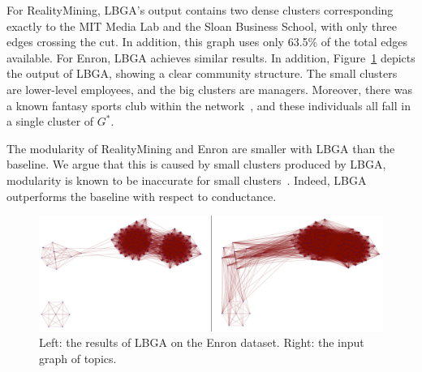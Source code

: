 \documentclass{article}
\begin{document}
For RealityMining, LBGA's output contains two dense clusters corresponding
exactly to the MIT Media Lab and the Sloan Business School, with only three
edges crossing the cut. In addition, this graph uses only 63.5\% of the total
edges available. For Enron, LBGA achieves similar results. In addition,
Figure~\ref{fig:enron-comparison} depicts the output of LBGA, showing a clear
community structure.  The small clusters are lower-level employees, and the big
clusters are managers. Moreover, there was a known fantasy sports club within
the network~\cite{Mccallum05}, and these individuals all fall in a single
cluster of $G^*$. 

The modularity of RealityMining and Enron are smaller with LBGA than the
baseline. We argue that this is caused by small clusters produced by LBGA,
modularity is known to be inaccurate for small clusters~\cite{Fortunato07}.
Indeed, LBGA outperforms the baseline with respect to conductance. 



\begin{figure}[t]
\begin{centering}
\includegraphics[width=\columnwidth]{figures/enron-comparison.pdf}
\par\end{centering}
\caption{Left: the results of LBGA on the Enron dataset. Right: the input graph
of topics.}
\label{fig:enron-comparison}
\end{figure}
\end{document}
